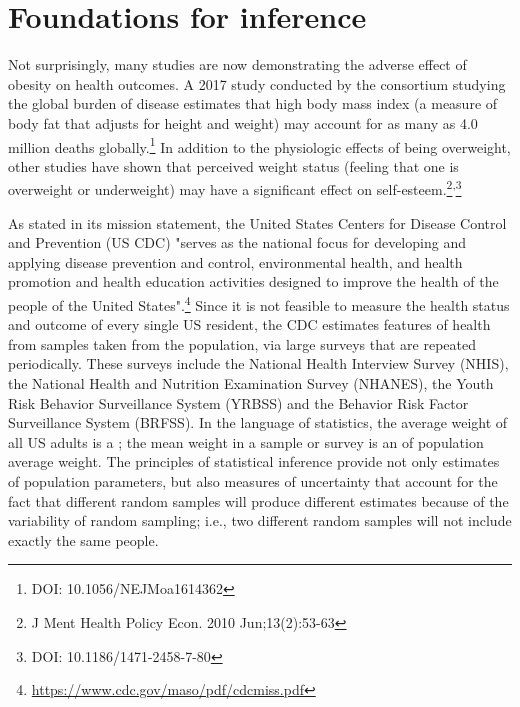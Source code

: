 

\chapter{Foundations for inference}
\label{foundationsForInference}

Not surprisingly, many studies are now demonstrating the adverse effect of obesity on health outcomes. A 2017 study conducted by the consortium studying the global burden of disease estimates that high body mass index (a measure of body fat that adjusts for height and weight) may account for as many as 4.0 million deaths globally.\footnote{DOI: 10.1056/NEJMoa1614362}  In addition to the physiologic effects of being overweight, other studies have shown that perceived weight status (feeling that one is overweight or underweight) may have a significant effect on self-esteem.\footnote{J Ment Health Policy Econ. 2010 Jun;13(2):53-63}\textsuperscript{,}\footnote{DOI: 10.1186/1471-2458-7-80}  

As stated in its mission statement, the United States Centers for Disease Control and Prevention (US CDC) "serves as the national focus for developing and applying disease prevention and control, environmental health, and health promotion and health education activities designed to improve the health of the people of the United States".\footnote{\url{https://www.cdc.gov/maso/pdf/cdcmiss.pdf}} Since it is not feasible to measure the health status and outcome of every single US resident, the CDC estimates features of health from samples taken from the population, via large surveys that are repeated periodically. These surveys include the National Health Interview Survey (NHIS), the National Health and Nutrition Examination Survey (NHANES), the Youth Risk Behavior Surveillance System (YRBSS) and the Behavior Risk Factor Surveillance System (BRFSS).  In the language of statistics, the average weight of all US adults is a ; the mean weight in a sample or survey is an  of population average weight.  The principles of statistical inference provide not only estimates of population parameters, but also measures of uncertainty that account for the fact that different random samples will produce different estimates because of the variability of random sampling; i.e., two different random samples will not include exactly the same people.

